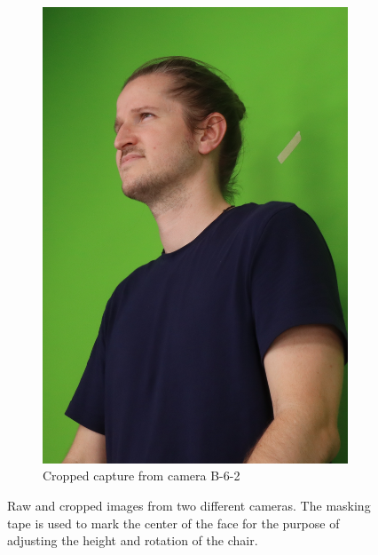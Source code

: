 \begin{figure}[ht]
\begin{subfigure}{0.4\linewidth}
		\includegraphics[width=\textwidth]{Figures/methods/6-B-6-2-163452-598_crop.JPG}
		\caption{Cropped capture from camera B-6-2}
	\end{subfigure}
	\caption{Raw and cropped images from two different cameras. The masking tape is used to mark the center of the face for the purpose of adjusting the height and rotation of the chair.}
	\label{fig:rawphotodome}
\end{figure}


